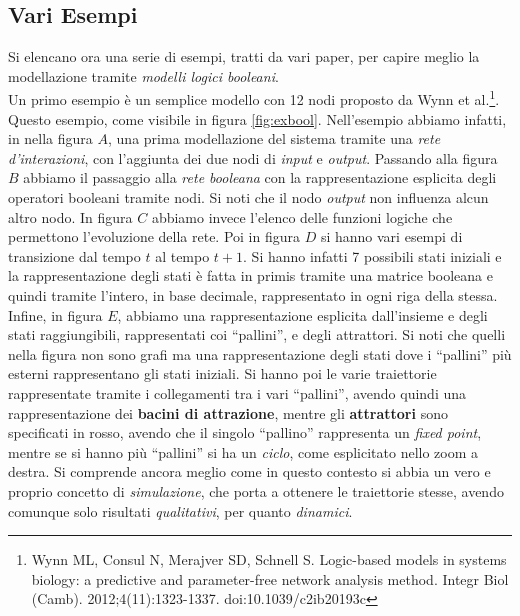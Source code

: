 \documentclass[a4paper,12pt, oneside]{book}
\begin{document}
\subsection{Vari Esempi}
Si elencano ora una serie di esempi, tratti da vari paper, per capire meglio la
modellazione tramite \textit{modelli logici booleani}.\\
Un primo esempio è un semplice modello con 12 nodi proposto da Wynn et
al.\footnote{Wynn ML, Consul N, Merajver SD, Schnell S. Logic-based models in
  systems biology: a predictive and parameter-free network analysis
  method. Integr Biol
  (Camb). 2012;4(11):1323-1337. doi:10.1039/c2ib20193c}. Questo esempio, come
visibile in figura \ref{fig:exbool}. Nell'esempio abbiamo infatti, in nella
figura $A$, una prima modellazione del sistema tramite una \textit{rete
  d'interazioni}, con l'aggiunta dei due nodi di \textit{input} e
\textit{output}. Passando alla figura $B$ abbiamo il passaggio alla 
\textit{rete booleana} con la rappresentazione esplicita degli operatori
booleani tramite nodi. Si noti che il nodo \textit{output} non influenza alcun
altro nodo. In figura $C$ abbiamo invece l'elenco delle funzioni logiche che
permettono l'evoluzione della rete. Poi in figura $D$ si hanno vari esempi di
transizione dal tempo $t$ al tempo $t+1$. Si hanno infatti 7 possibili stati
iniziali e la rappresentazione degli stati è fatta in primis tramite una matrice
booleana e quindi tramite l'intero, in base decimale, rappresentato in ogni riga
della stessa. Infine, in figura $E$, abbiamo una rappresentazione esplicita
dall'insieme e degli stati raggiungibili, rappresentati coi ``pallini'', e degli
attrattori. Si noti che quelli nella figura non sono grafi ma una 
rappresentazione degli stati dove i ``pallini'' più esterni rappresentano gli
stati iniziali. Si hanno poi le varie traiettorie rappresentate tramite i
collegamenti tra i vari ``pallini'', avendo quindi una rappresentazione dei
\textbf{bacini di attrazione}, mentre gli \textbf{attrattori} sono specificati
in rosso, avendo che il singolo ``pallino'' rappresenta un \textit{fixed point},
mentre se si hanno più ``pallini'' si ha un \textit{ciclo}, come esplicitato
nello zoom a destra. Si comprende ancora meglio come in questo contesto si abbia
un vero e proprio concetto di \textit{simulazione}, che porta a ottenere le
traiettorie stesse, avendo comunque solo risultati \textit{qualitativi}, per
quanto \textit{dinamici}.  \\
\end{document}
